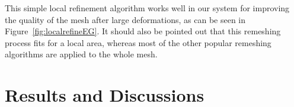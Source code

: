 This simple local refinement algorithm works well in our system for improving the quality of the mesh after large deformations, as can be seen in Figure~\ref{fig:localrefineEG}. It should also be pointed out that this remeshing process fits for a local area, whereas most of the other popular remeshing algorithms are applied to the whole mesh.

%
%
%

\section{Results and Discussions}\label{ch3:sec:result}

